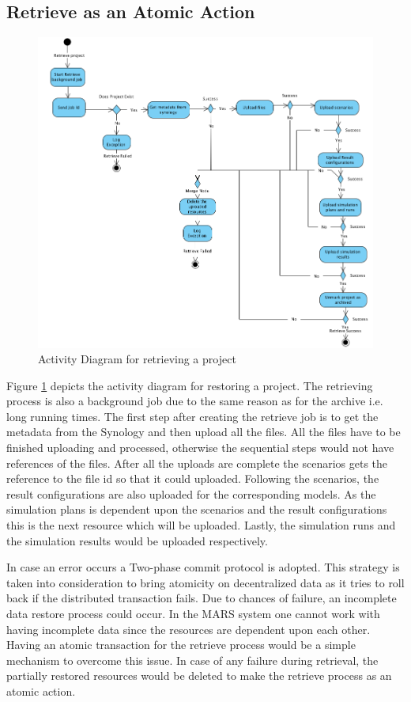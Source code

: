 \subsection{Retrieve as an Atomic Action}
\begin{figure}[H]
    \centering \includegraphics[scale=0.45]{grafiken/restoreActivity.png}
    \caption{Activity Diagram for retrieving a project}
    \label{fig:activityRestore}
\end{figure}

Figure \ref{fig:activityRestore} depicts the activity diagram for restoring a project. The retrieving process is also a background job due to the same reason
as for the archive i.e. long running times. The first step after creating the retrieve job is to get the metadata from the Synology and then upload all the files.
All the files have to be finished uploading and processed, otherwise the sequential steps would not have references of the files. After all the uploads are complete
the scenarios gets the reference to the file id so that it could uploaded. Following the scenarios, the result configurations are also uploaded for the corresponding models.
As the simulation plans is dependent upon the scenarios and the result configurations this is the next resource which will be uploaded. Lastly, the simulation runs
and the simulation results would be uploaded respectively. 

In case an error occurs a Two-phase commit protocol \cite{atomic} is adopted. This strategy is taken into consideration to bring atomicity on decentralized data
as it tries to roll back if the distributed transaction fails.
Due to chances of failure, an incomplete data restore process could occur. In the MARS system one cannot work with having
incomplete data since the resources are dependent upon each other. Having an atomic transaction for the retrieve process would be a simple mechanism to overcome
this issue. In case of any failure during retrieval, the partially restored resources would be deleted to make the retrieve process as an atomic action.

